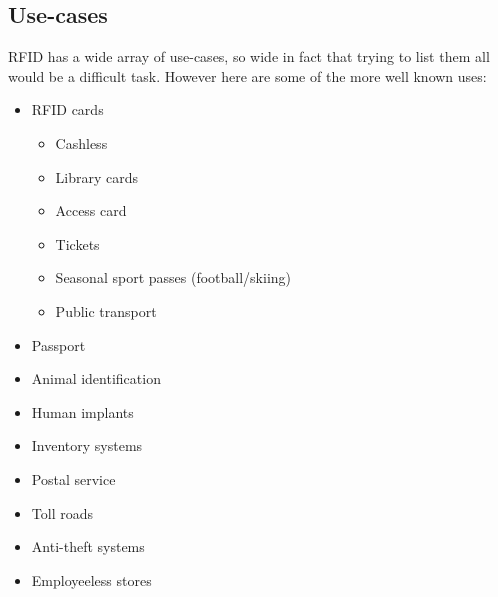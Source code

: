 \subsection{Use-cases}
RFID has a wide array of use-cases, so wide in fact that trying to list them all would be a difficult task. However here are some of the more well known uses:
\begin{itemize}
    \item RFID cards
    \begin{itemize}[\FilledSmallSquare]
        \item Cashless \cite{cashless2018}
        \item Library cards
        \item Access card
        \item Tickets
        \item Seasonal sport passes (football/skiing)
        \item Public transport
        \end{itemize}
    \item Passport
    \item Animal identification
    \item Human implants
    \item Inventory systems
    \item Postal service
    \item Toll roads
    \item Anti-theft systems
    \item Employeeless stores
\end{itemize}

\newpage

